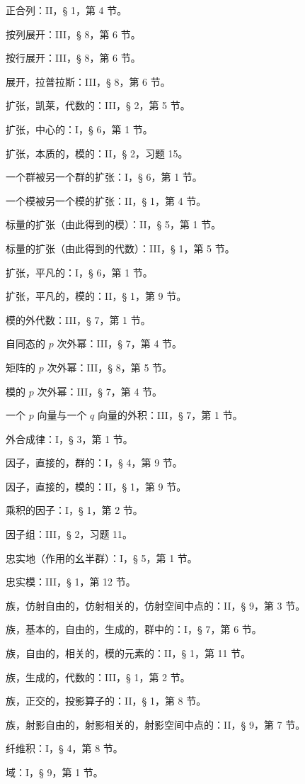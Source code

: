 正合列：II，§ 1，第 4 节。

按列展开：III，§ 8，第 6 节。

按行展开：III，§ 8，第 6 节。

展开，拉普拉斯：III，§ 8，第 6 节。

扩张，凯莱，代数的：III，§ 2，第 5 节。

扩张，中心的：I，§ 6，第 1 节。

扩张，本质的，模的：II，§ 2，习题 15。

一个群被另一个群的扩张：I，§ 6，第 1 节。

一个模被另一个模的扩张：II，§ 1，第 4 节。

标量的扩张（由此得到的模）：II，§ 5，第 1 节。

标量的扩张（由此得到的代数）：III，§ 1，第 5 节。

扩张，平凡的：I，§ 6，第 1 节。

扩张，平凡的，模的：II，§ 1，第 9 节。

模的外代数：III，§ 7，第 1 节。

自同态的 \(p\) 次外幂：III，§ 7，第 4 节。

矩阵的 \(p\) 次外幂：III，§ 8，第 5 节。

模的 \(p\) 次外幂：III，§ 7，第 4 节。

一个 \(p\) 向量与一个 \(q\) 向量的外积：III，§ 7，第 1 节。

外合成律：I，§ 3，第 1 节。

因子，直接的，群的：I，§ 4，第 9 节。

因子，直接的，模的：II，§ 1，第 9 节。

乘积的因子：I，§ 1，第 2 节。

因子组：III，§ 2，习题 11。

忠实地（作用的幺半群）：I，§ 5，第 1 节。

忠实模：III，§ 1，第 12 节。

族，仿射自由的，仿射相关的，仿射空间中点的：II，§ 9，第 3 节。

族，基本的，自由的，生成的，群中的：I，§ 7，第 6 节。

族，自由的，相关的，模的元素的：II，§ 1，第 11 节。

族，生成的，代数的：III，§ 1，第 2 节。

族，正交的，投影算子的：II，§ 1，第 8 节。

族，射影自由的，射影相关的，射影空间中点的：II，§ 9，第 7 节。

纤维积：I，§ 4，第 8 节。

域：I，§ 9，第 1 节。

